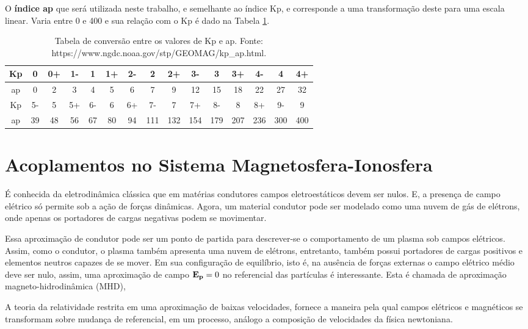 O {\bf índice ap} que será utilizada neste trabalho, e semelhante ao índice Kp, e corresponde a uma transformação deste para uma escala linear. Varia entre 0 e 400 e sua relação com o Kp é dado na Tabela \ref{tab:kptoap}.

\begin{table}[hhh]
\begin{tabular}{|c|c|c|c|c|c|c|c|c|c|c|c|c|c|c|} \hline
Kp & 0  & 0+ & 1- & 1  & 1+ & 2- & 2   & 2+  & 3-  & 3   & 3+  & 4-  & 4   & 4+  \\ \hline
ap & 0  & 2  & 3  & 4  & 5  & 6  & 7   & 9   & 12  & 15  & 18  & 22  & 27  & 32  \\ \hline
Kp & 5- & 5  & 5+ & 6- & 6  & 6+ & 7-  & 7   & 7+  & 8-  & 8   & 8+  & 9-  & 9   \\ \hline
ap & 39 & 48 & 56 & 67 & 80 & 94 & 111 & 132 & 154 & 179 & 207 & 236 & 300 & 400 \\ \hline
\end{tabular}
\caption{Tabela de conversão entre os valores de Kp e ap. Fonte: https://www.ngdc.noaa.gov/stp/GEOMAG/kp\_ap.html.}
\label{tab:kptoap}
\end{table}

\section{Acoplamentos no Sistema Magnetosfera-Ionosfera}

É conhecida da eletrodinâmica clássica que em matérias condutores campos eletroestáticos devem ser nulos. E, a presença de campo elétrico só permite sob a ação de forças dinâmicas. Agora, um material condutor pode ser modelado como uma nuvem de gás de elétrons, onde apenas os portadores de cargas negativas podem se movimentar. 

Essa aproximação de condutor pode ser um ponto de partida para descrever-se o comportamento de um plasma sob campos elétricos. Assim, como o condutor, o plasma também apresenta uma nuvem de elétrons, entretanto, também possui portadores de cargas positivos e elementos neutros capazes de se mover. Em sua configuração de equilíbrio, isto é, na ausência de forças externas o campo elétrico médio deve ser nulo, assim, uma aproximação de campo ${\bf E_p}=0$ no referencial das partículas é interessante. Esta é chamada de aproximação magneto-hidrodinâmica (MHD), \cite{ROEDERER:1979} 

A teoria da relatividade restrita em uma aproximação de baixas velocidades, fornece a maneira pela qual campos elétricos e magnéticos se transformam sobre mudança de referencial, em um processo, análogo a composição de velocidades da física newtoniana.

